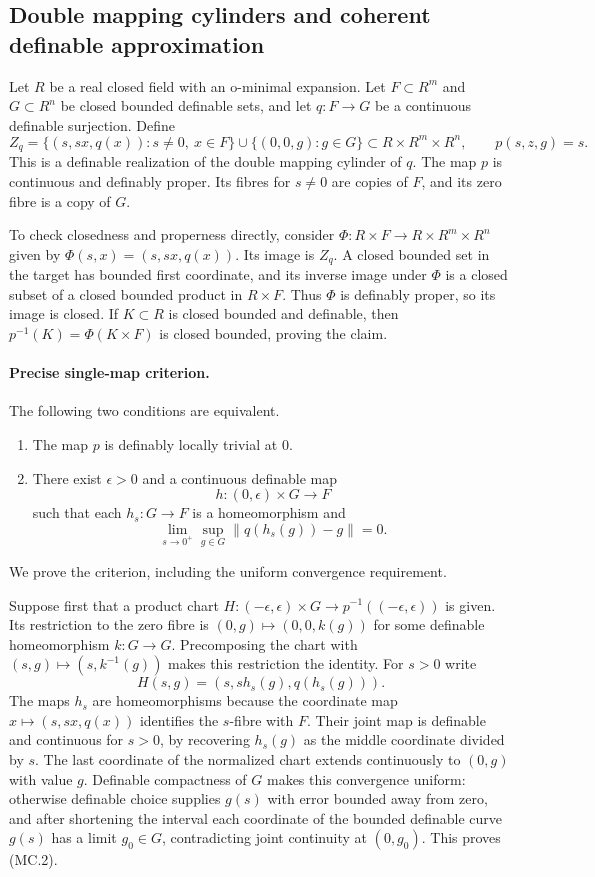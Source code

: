 \subsection*{Double mapping cylinders and coherent definable approximation}

Let $R$ be a real closed field with an o-minimal expansion. Let
$F\subset R^m$ and $G\subset R^n$ be closed bounded definable sets,
and let $q:F\to G$ be a continuous definable surjection. Define
\[
 Z_q=\{(s,sx,q(x)):s\ne0,\ x\in F\}
         \cup\{(0,0,g):g\in G\}\subset R\times R^m\times R^n,
 \qquad p(s,z,g)=s.
 \tag{MC.1}
\]
This is a definable realization of the double mapping cylinder of $q$.
The map $p$ is continuous and definably proper. Its fibres for $s\ne0$
are copies of $F$, and its zero fibre is a copy of $G$.

To check closedness and properness directly, consider
$\Phi:R\times F\to R\times R^m\times R^n$ given by
$\Phi(s,x)=(s,sx,q(x))$. Its image is $Z_q$. A closed bounded set
in the target has bounded first coordinate, and its inverse image under
$\Phi$ is a closed subset of a closed bounded product in $R\times F$.
Thus $\Phi$ is definably proper, so its image is closed. If $K\subset R$
is closed bounded and definable, then
$p^{-1}(K)=\Phi(K\times F)$ is closed bounded, proving the claim.

\paragraph{Precise single-map criterion.}
The following two conditions are equivalent.
\begin{enumerate}
\item The map $p$ is definably locally trivial at $0$.
\item There exist $\epsilon>0$ and a continuous definable map
\[
 h:(0,\epsilon)\times G\longrightarrow F
\]
such that each $h_s:G\to F$ is a homeomorphism and
\[
 \lim_{s\to0^+}\sup_{g\in G}\lVert q(h_s(g))-g\rVert=0.
 \tag{MC.2}
\]
\end{enumerate}
We prove the criterion, including the uniform convergence requirement.

Suppose first that a product chart
$H:(-\epsilon,\epsilon)\times G\to p^{-1}((-
\epsilon,\epsilon))$ is given. Its restriction to the zero fibre is
$(0,g)\mapsto(0,0,k(g))$ for some definable homeomorphism $k:G\to G$.
Precomposing the chart with $(s,g)\mapsto(s,k^{-1}(g))$ makes this
restriction the identity. For $s>0$ write
\[
 H(s,g)=(s,s h_s(g),q(h_s(g))).
\]
The maps $h_s$ are homeomorphisms because the coordinate map
$x\mapsto(s,sx,q(x))$ identifies the $s$-fibre with $F$.
Their joint map is definable and continuous for $s>0$, by recovering
$h_s(g)$ as the middle coordinate divided by $s$.
The last coordinate of the normalized chart extends continuously to
$(0,g)$ with value $g$. Definable compactness of $G$ makes this
convergence uniform: otherwise definable choice supplies $g(s)$ with
error bounded away from zero, and after shortening the interval each
coordinate of the bounded definable curve $g(s)$ has a limit
$g_0\in G$, contradicting joint continuity at $(0,g_0)$.
This proves (MC.2).

